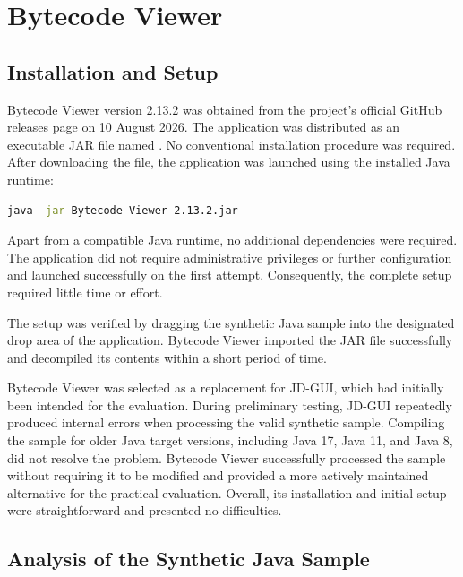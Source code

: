 \section{Bytecode Viewer}
\label{sec:analysis:bytecode-viewer}

\subsection{Installation and Setup}
\label{subsec:analysis:bytecode-viewer:setup}
Bytecode Viewer version 2.13.2 was obtained from the project's official GitHub releases page on 10 August 2026. The application was distributed as an executable JAR 
file named . No conventional installation procedure was required. After downloading the file, the application was launched using 
the installed Java runtime:

\begin{lstlisting}[language=bash]
java -jar Bytecode-Viewer-2.13.2.jar
\end{lstlisting}

Apart from a compatible Java runtime, no additional dependencies were required. The application did not require administrative privileges or further configuration 
and launched successfully on the first attempt. Consequently, the complete setup required little time or effort.

The setup was verified by dragging the synthetic Java sample into the designated drop area of the application. Bytecode Viewer imported the JAR file successfully 
and decompiled its contents within a short period of time.

Bytecode Viewer was selected as a replacement for JD-GUI, which had initially been intended for the evaluation. During preliminary testing, JD-GUI repeatedly 
produced internal errors when processing the valid synthetic sample. Compiling the sample for older Java target versions, including Java 17, Java 11, and Java 8, 
did not resolve the problem. Bytecode Viewer successfully processed the sample without requiring it to be modified and provided a more actively maintained 
alternative for the practical evaluation. Overall, its installation and initial setup were straightforward and presented no difficulties.

\subsection{Analysis of the Synthetic Java Sample}
\label{subsec:analysis:bytecode-viewer:synthetic}

